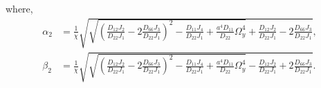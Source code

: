 \documentclass[preprint,12pt,number]{elsarticle}
\begin{document}
%
where,
%
\begin{subequations}\label{eq:beta}
\begin{align}
	\alpha_2 &= \frac{1}{\chi} \sqrt{ \sqrt{ \left( \frac{D_{12}J_2}{D_{22}J_1} - 2\frac{D_{66}J_3}{D_{22}J_1} \right)^2 - \frac{D_{11}J_4}{D_{22}J_1} + \frac{a^4 D_{11}}{D_{22}} \Omega_y^4 } + \frac{D_{12}J_2}{D_{22}J_1} - 2 \frac{D_{66}J_3}{D_{22}J_1}}, \label{eq:betay1}\\
	\beta_2 &= \frac{1}{\chi} \sqrt{ \sqrt{ \left( \frac{D_{12}J_2}{D_{22}J_1} - 2 \frac{D_{66}J_3}{D_{22}J_1} \right)^2 - \frac{D_{11}J_4}{D_{22}J_1} + \frac{a^4 D_{11}}{D_{22}} \Omega_y^4 } - \frac{D_{12}J_2}{D_{22}J_1} + 2 \frac{D_{66}J_3}{D_{22}J_1}}.\label{eq:betay2}
\end{align}
\end{subequations}
\end{document}
